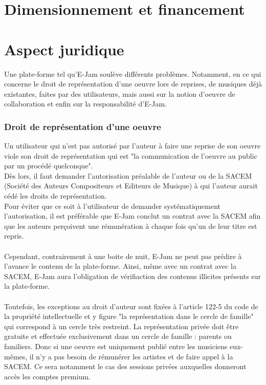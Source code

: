 \documentclass[a4,12pt]{article}
\begin{document}
\section{Dimensionnement et financement}


\section{Aspect juridique}
Une plate-forme tel qu'E-Jam soulève différents problèmes. Notamment, en ce qui concerne le droit de représentation d'une oeuvre lors de reprises, de musiques déjà existantes, faites par des utilisateurs, mais aussi sur la notion d'oeuvre de collaboration et enfin sur la responsabilité d'E-Jam.
\subsubsection{Droit de représentation d'une oeuvre}
Un utilisateur qui n'est pas autorisé par l'auteur à faire une reprise de son oeuvre viole son droit de représentation qui est "la communication de l'oeuvre au public par un procédé quelconque".\\
Dès lors, il faut demander l'autorisation préalable de l'auteur ou de la SACEM (Société des Auteurs Compositeurs et Editeurs de Musique) à qui l'auteur aurait cédé les droits de représentation.\\
Pour éviter que ce soit à l'utilisateur de demander systématiquement l'autorisation, il est préférable que E-Jam conclut un contrat avec la SACEM afin que les auteurs perçoivent une rémunération à chaque fois qu'un de leur titre est repris.\\
\\
Cependant, contrairement à une boite de nuit, E-Jam ne peut pas prédire à l'avance le contenu de la plate-forme. Ainsi, même avec un contrat avec la SACEM, E-Jam aura l'obligation de vérifiaction des contenus illicites présents sur la plate-forme.\\
\\
Toutefois, les exceptions au droit d'auteur sont fixées à l'article 122-5 du code de la propriété intellectuelle et y figure "la représentation dans le cercle de famille" qui correspond à un cercle très restreint. La représentation privée doit être gratuite et effectuée exclusivement dans un cercle de famille : parents ou familiers. Donc si une oeuvre est uniquement publié entre les musiciens eux-mêmes, il n'y a pas besoin de rémunérer les artistes et de faire appel à la SACEM. Ce sera notamment le cas des sessions privées auxquelles donneront accès les comptes premium.
\end{document}
